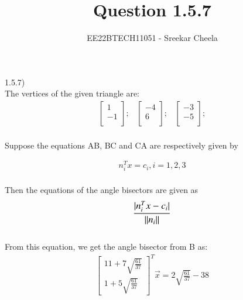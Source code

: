 \documentclass[journal,12pt,twocolumn]{IEEEtran}
\theoremstyle{remark}
\begin{document}
%




\vspace{3cm}

\title{
Question 1.5.7
}
\author{ EE22BTECH11051 - Sreekar Cheela 
}	

\maketitle

\newpage


1.5.7)
\\
\large The vertices of the given triangle are:
\begin{equation}
    \begin{array}{ccc}
        \begin{bmatrix}
            1 \\
            -1 \\
        \end{bmatrix};
        &
        \begin{bmatrix}
            -4 \\
            6 \\
        \end{bmatrix};
        &
        \begin{bmatrix}
            -3\\
            -5\\
        \end{bmatrix};
    \end{array}
\end{equation}
\\
Suppose the equations AB, BC and CA are respectively given by

 \large \begin{align}
    n_{i}^{T} x = c_i , i = 1,2,3
    \end{align}
\\
Then the equations of the angle bisectors are given as 
\\
\begin{align}
    \text {\large$\displaystyle \frac{\lvert n_{i}^{T} x - c_i  \rvert}{\lvert \lvert n_{i} \rvert \rvert}$}
\end{align}
 \\
\bigskip 
 From this equation, we get the angle bisector from B as:
  \begin{align}
        \begin{bmatrix}
            11 + 7\sqrt{\frac{61}{37}} \\
            1 + 5\sqrt{\frac{61}{37}}
        \end{bmatrix}^{T}
        \vec {x} = 2\sqrt{\frac{61}{37}}-38
    \end{align}
    
\end{document}
